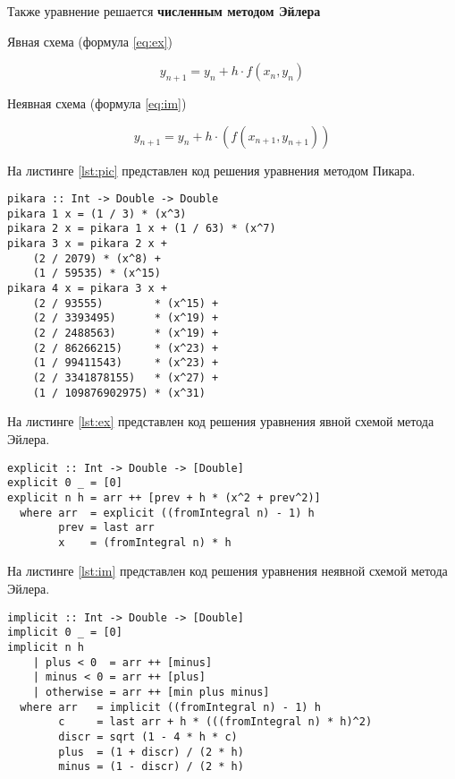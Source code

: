 Также уравнение решается \textbf{численным методом Эйлера}

Явная схема (формула \ref{eq:ex})

\begin{equation}\label{eq:ex}
    y_{n+1} = y_n + h \cdot f(x_n, y_n)
\end{equation}

Неявная схема (формула \ref{eq:im})

\begin{equation}\label{eq:im}
    y_{n+1} = y_n + h \cdot (f(x_{n+1}, y_{n+1}))
\end{equation}

На листинге \ref{lst:pic} представлен код решения уравнения методом
Пикара.

\begin{lstlisting}[label=lst:pic,caption=Метод Пикара]
pikara :: Int -> Double -> Double
pikara 1 x = (1 / 3) * (x^3)
pikara 2 x = pikara 1 x + (1 / 63) * (x^7)
pikara 3 x = pikara 2 x +
    (2 / 2079) * (x^8) +
    (1 / 59535) * (x^15)
pikara 4 x = pikara 3 x +
    (2 / 93555)        * (x^15) +
    (2 / 3393495)      * (x^19) +
    (2 / 2488563)      * (x^19) +
    (2 / 86266215)     * (x^23) +
    (1 / 99411543)     * (x^23) +
    (2 / 3341878155)   * (x^27) +
    (1 / 109876902975) * (x^31)
\end{lstlisting}


На листинге \ref{lst:ex} представлен код решения уравнения явной
схемой метода Эйлера.

\begin{lstlisting}[label=lst:ex,caption=Явная схема метода Эйлера]
explicit :: Int -> Double -> [Double]
explicit 0 _ = [0]
explicit n h = arr ++ [prev + h * (x^2 + prev^2)]
  where arr  = explicit ((fromIntegral n) - 1) h
        prev = last arr
        x    = (fromIntegral n) * h
\end{lstlisting}

На листинге \ref{lst:im} представлен код решения уравнения неявной
схемой метода Эйлера.

\begin{lstlisting}[label=lst:im,caption=Неявная схема метода Эйлера]
implicit :: Int -> Double -> [Double]
implicit 0 _ = [0]
implicit n h
    | plus < 0  = arr ++ [minus]
    | minus < 0 = arr ++ [plus]
    | otherwise = arr ++ [min plus minus]
  where arr   = implicit ((fromIntegral n) - 1) h
        c     = last arr + h * (((fromIntegral n) * h)^2)
        discr = sqrt (1 - 4 * h * c)
        plus  = (1 + discr) / (2 * h)
        minus = (1 - discr) / (2 * h)
\end{lstlisting}

